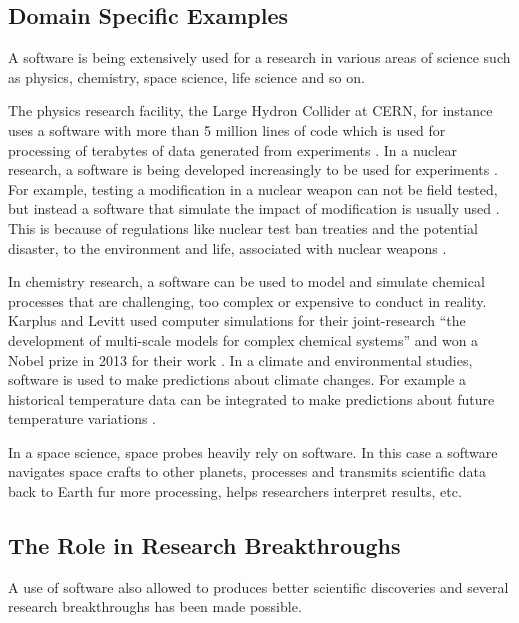 \subsection{Domain Specific Examples}
A software is being extensively used for a research in various areas of science such as physics, chemistry, space science, life science and so on.

The physics research facility, the Large Hydron Collider at CERN, for instance uses a software with more than 5 million lines of code which is used for processing of terabytes of data generated from experiments \cite{storer2017bridging}.
In a nuclear research, a software is being developed increasingly to be used for experiments \cite{yan2017case}. For example, testing a modification in a nuclear weapon can not be field tested, but instead a software that simulate the impact of modification is usually used \cite{kanewala2014testing}. This is because of regulations like nuclear test ban treaties and the potential disaster, to the environment and life, associated with nuclear weapons \cite{enwiki:1053274189}. 

In chemistry research, a software can be used to model and simulate chemical processes that are challenging, too complex or expensive to conduct in reality. Karplus and Levitt used computer simulations for their joint-research “the development of multi-scale models for complex chemical systems”  and won a Nobel prize in 2013 for their work \cite{storer2017bridging}\cite{andre2014nobel}. 
In a climate and environmental studies, software is used to make predictions about climate changes. For example a historical temperature data can be integrated to make predictions about future temperature variations \cite{storer2017bridging}.

In a space science, space probes heavily rely on software. In this case a software navigates space crafts to other planets, processes and transmits scientific data back to Earth fur more processing, helps researchers interpret results, etc\cite{lutz2011software}.


\subsection{The Role in Research Breakthroughs  }
A use of software also allowed to produces better scientific discoveries and several research breakthroughs has been made possible\cite{goble2014better}. 

